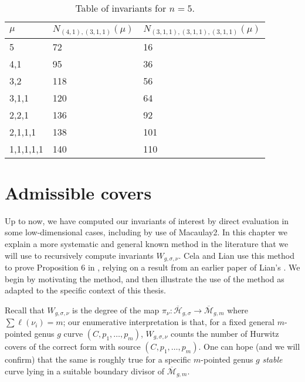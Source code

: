 \documentclass[thesis]{thesis-umich}           %
\newcommand{\mb}{\overline{\mathcal M}}
\newcommand{\Hb}{\overline{\mathcal H}}
\theoremstyle{definition}
\begin{document}
  \begin{table}[h]
    \caption{Table of invariants for $n=5$.}
    \centering
    ~\\
\begin{tabular}{|l|l|l|}
\hline
$\mu$             & $N_{(4,1),(3,1,1)}(\mu)$ & $N_{(3,1,1),(3,1,1),(3,1,1)}(\mu)$ \\ \hline
{5} & {72}                                       & {16}                    \\ \hline
4,1                     & {95}                                       & {36}                    \\ \hline
3,2                     & {118}                                      & {56}                    \\ \hline
3,1,1                   & {120}                                      & {64}                    \\ \hline
2,2,1                   & {136}                                      & {92}                    \\ \hline
2,1,1,1                 & {138}                                      & {101}                   \\ \hline
1,1,1,1,1               & {140}                                      & 110                                        \\ \hline
\end{tabular}
\end{table}

\chapter{Admissible covers}
\label{section:admissible}

Up to now, we have computed our invariants of interest by direct evaluation in some
low-dimensional cases, including
by use of Macaulay2. 
In this chapter we explain a more systematic and general
known method in the literature that we will use
to recursively compute invariants $W_{g,\sigma,\nu}$. Cela and Lian use this method to prove Proposition 6 in \cite{Generalized}, relying on a result from an earlier paper of Lian's \cite{Lian}. We begin by motivating the method, and then illustrate the use of the method as adapted to the specific context of this thesis.

Recall that $W_{g,\sigma,\nu}$ is the degree of the map $\pi_{\nu}:\Hb_{g,\sigma}\to\mb_{g,m}$
where $\sum\ell(\nu_i)=m$; our enumerative interpretation is that, for a fixed general $m$-pointed genus $g$ curve $(C,p_1,\dots,p_m)$, $W_{g,\sigma,\nu}$ counts the number of Hurwitz covers of the correct form with source $(C,p_1,\dots,p_m)$. One can hope (and we will confirm) that the same is roughly true for
a specific $m$-pointed genus $g$ {\it stable} curve lying in a suitable boundary divisor of $\mb_{g,m}$.
\end{document}

